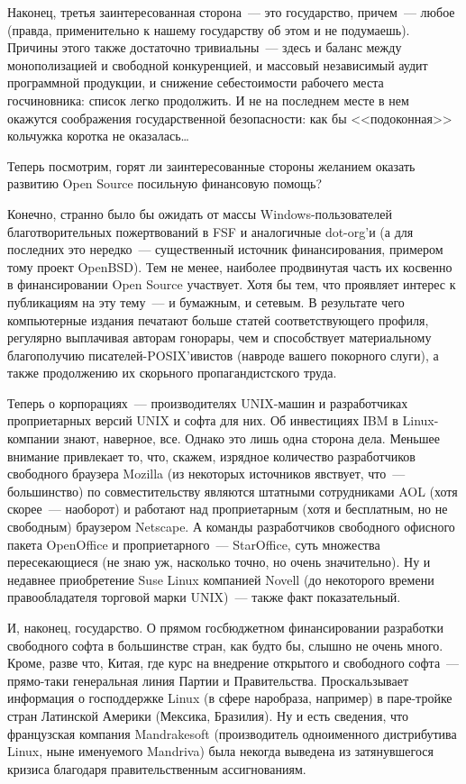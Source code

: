 Наконец, третья заинтересованная сторона~--- это государство, причем~--- любое (правда, применительно к нашему государству об этом и не подумаешь). Причины этого также достаточно тривиальны~--- здесь и баланс между монополизацией и свободной конкуренцией, и массовый независимый аудит программной продукции, и снижение себестоимости рабочего места госчиновника: список легко продолжить. И не на последнем месте в нем окажутся соображения государственной безопасности: как бы <<подоконная>> кольчужка коротка не оказалась\dots

Теперь посмотрим, горят ли заинтересованные стороны желанием оказать развитию Open Source посильную финансовую помощь?

Конечно, странно было бы ожидать от массы Windows-пользователей благотворительных пожертвований в FSF и аналогичные dot-org'и (а для последних это нередко~--- существенный источник финансирования, примером тому проект OpenBSD). Тем не менее, наиболее продвинутая часть их косвенно в финансировании Open Source участвует. Хотя бы тем, что проявляет интерес к публикациям на эту тему~--- и бумажным, и сетевым. В результате чего компьютерные издания печатают больше статей соответствующего профиля, регулярно выплачивая авторам гонорары, чем и способствует материальному благополучию писателей-POSIX'ивистов (навроде вашего покорного слуги), а также продолжению их скорьного пропагандистского труда.

Теперь о корпорациях~--- производителях UNIX-машин и разработчиках проприетарных версий UNIX и софта для них. Об инвестициях IBM в Linux-компании знают, наверное, все. Однако это лишь одна сторона дела. Меньшее внимание привлекает то, что, скажем, изрядное количество разработчиков свободного браузера Mozilla (из некоторых источников явствует, что~--- большинство) по совместительству являются штатными сотрудниками AOL (хотя скорее~--- наоборот) и работают над проприетарным (хотя и бесплатным, но не свободным) браузером Netscape. А команды разработчиков свободного офисного пакета OpenOffice и проприетарного~--- StarOffice, суть множества пересекающиеся (не знаю уж, насколько точно, но очень значительно). Ну и недавнее приобретение Suse Linux компанией Novell (до некоторого времени правообладателя торговой марки UNIX)~--- также факт показательный.

И, наконец, государство. О прямом госбюджетном финансировании разработки свободного софта в большинстве стран, как будто бы, слышно не очень много. Кроме, разве что, Китая, где курс на внедрение открытого и свободного софта~--- прямо-таки генеральная линия Партии и Правительства. Проскальзывает информация о господдержке Linux (в сфере наробраза, например) в паре-тройке стран Латинской Америки (Мексика, Бразилия). Ну и есть сведения, что французская компания Mandrakesoft (производитель одноименного дистрибутива Linux, ныне именуемого Mandriva) была некогда выведена из затянувшегося кризиса благодаря правительственным ассигнованиям.


